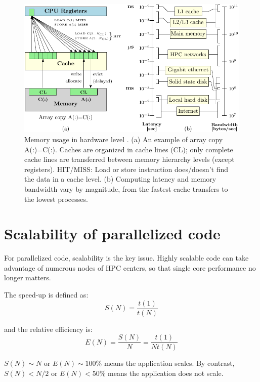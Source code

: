 \begin{figure}[h]
\begin{centering}
\includegraphics{_figure/memory}
\par\end{centering}
\caption[Memory usage in hardware level]{Memory usage in hardware level \citep{LRZ-cours}. (a) An example
of array copy A(:)=C(:). Caches are organized in cache lines (CL);
only complete cache lines are transferred between memory hierarchy
levels (except registers). HIT/MISS: Load or store instruction does/doesn't
find the data in a cache level. (b) Computing latency and memory bandwidth
vary by magnitude, from the fastest cache transfers to the lowest
processes.\label{fig:Memory}}
\end{figure}


\section{Scalability of parallelized code}

For parallelized code, scalability is the key issue. Highly scalable
code can take advantage of numerous nodes of HPC centers, so that
single core performance no longer matters. 

The speed-up is defined as:
\begin{equation}
S(N)=\dfrac{t(1)}{t(N)}
\end{equation}

and the relative efficiency is:
\begin{equation}
E(N)=\dfrac{S(N)}{N}=\dfrac{t(1)}{Nt(N)}
\end{equation}

$S(N)\sim N$ or $E(N)\sim100\%$ means the application scales. By
contrast, $S(N)<N/2$ or $E(N)<50\%$ means the application does not
scale. 

